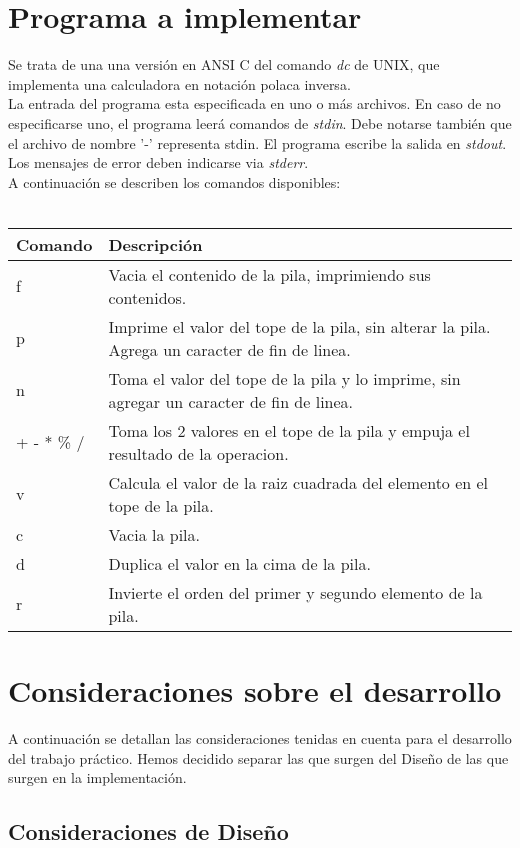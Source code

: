 \documentclass[a4paper,10pt]{article}
\begin{document}
\section{Programa a implementar}
Se trata de una una versi\'on en ANSI C del comando \textit{dc} de UNIX, que implementa una calculadora en notaci\'on polaca inversa.
\\
La entrada del programa esta especificada en uno o m\'as archivos. En caso de no especificarse uno, el programa leer\'a comandos de \textit{stdin}. Debe notarse tambi\'en que el archivo de nombre '-' representa stdin. El programa escribe la salida en \textit{stdout}. Los mensajes de error deben indicarse via \textit{stderr}.
\\
A continuaci\'on se describen los comandos disponibles:\\
\\
\begin{tabular}{|l|l|}
\hline
Comando & Descripci\'on \\ \hline
f & Vacia el contenido de la pila, imprimiendo sus contenidos. \\
p & Imprime el valor del tope de la pila, sin alterar la pila. Agrega un caracter de fin de linea. \\
n & Toma el valor del tope de la pila y lo imprime, sin agregar un caracter de fin de linea. \\
+ - * \% / & Toma los 2 valores en el tope de la pila y empuja el resultado de la operacion. \\
v & Calcula el valor de la raiz cuadrada del elemento en el tope de la pila. \\
c & Vacia la pila. \\
d & Duplica el valor en la cima de la pila. \\
r & Invierte el orden del primer y segundo elemento de la pila. \\
\hline
\end{tabular}

\section{Consideraciones sobre el desarrollo}
A continuaci\'on se detallan las consideraciones tenidas en cuenta para el desarrollo del trabajo pr\'actico. Hemos decidido separar las que surgen del Dise\~no de las que surgen en la implementaci\'on.

\subsection{Consideraciones de Dise\~no}
\end{document}
